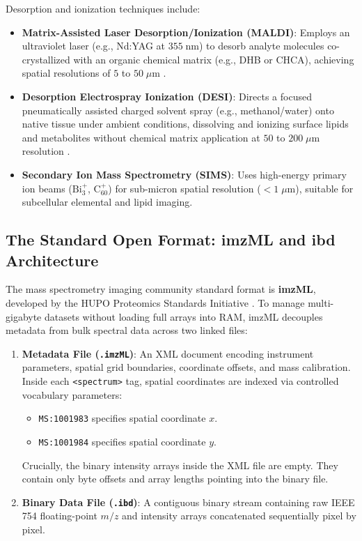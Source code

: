 \documentclass[11pt,twoside,openright]{book}
\begin{document}
Desorption and ionization techniques include:
\begin{itemize}
    \item \textbf{Matrix-Assisted Laser Desorption/Ionization (MALDI)}: Employs an ultraviolet laser (e.g., Nd:YAG at $355\;\text{nm}$) to desorb analyte molecules co-crystallized with an organic chemical matrix (e.g., DHB or CHCA), achieving spatial resolutions of $5$ to $50\;\mu\text{m}$ \cite{schramm2012imputing}.
    \item \textbf{Desorption Electrospray Ionization (DESI)}: Directs a focused pneumatically assisted charged solvent spray (e.g., methanol/water) onto native tissue under ambient conditions, dissolving and ionizing surface lipids and metabolites without chemical matrix application at $50$ to $200\;\mu\text{m}$ resolution \cite{takats2004mass}.
    \item \textbf{Secondary Ion Mass Spectrometry (SIMS)}: Uses high-energy primary ion beams ($\text{Bi}_3^+$, $\text{C}_{60}^+$) for sub-micron spatial resolution ($<1\;\mu\text{m}$), suitable for subcellular elemental and lipid imaging.
\end{itemize}

\subsection{The Standard Open Format: imzML and ibd Architecture}

The mass spectrometry imaging community standard format is \textbf{imzML}, developed by the HUPO Proteomics Standards Initiative \cite{schramm2012imputing}. To manage multi-gigabyte datasets without loading full arrays into RAM, imzML decouples metadata from bulk spectral data across two linked files:

\begin{enumerate}
    \item \textbf{Metadata File (\texttt{.imzML})}: An XML document encoding instrument parameters, spatial grid boundaries, coordinate offsets, and mass calibration. Inside each \texttt{<spectrum>} tag, spatial coordinates are indexed via controlled vocabulary parameters:
    \begin{itemize}
        \item \texttt{MS:1001983} specifies spatial coordinate $x$.
        \item \texttt{MS:1001984} specifies spatial coordinate $y$.
    \end{itemize}
    Crucially, the binary intensity arrays inside the XML file are empty. They contain only byte offsets and array lengths pointing into the binary file.
    \item \textbf{Binary Data File (\texttt{.ibd})}: A contiguous binary stream containing raw IEEE 754 floating-point $m/z$ and intensity arrays concatenated sequentially pixel by pixel.
\end{enumerate}
\end{document}

